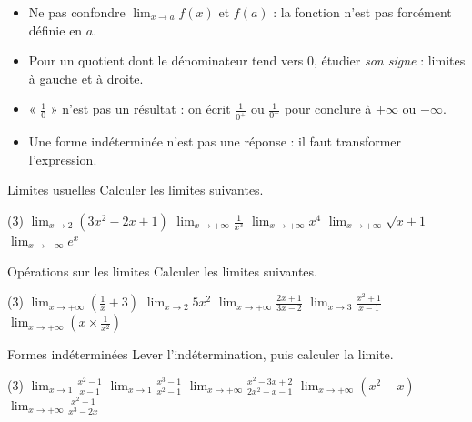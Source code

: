 \begin{attention}
\begin{itemize}[label={\color{otOrange}\textbullet},leftmargin=1.4em,itemsep=0.6mm,topsep=0.5mm]
  \item Ne pas confondre $\displaystyle\lim_{x\to a}f(x)$ et $f(a)$ : la fonction n'est pas forcément définie en $a$.
  \item Pour un quotient dont le dénominateur tend vers $0$, étudier \emph{son signe} : limites à gauche et à droite.
  \item « $\frac{1}{0}$ » n'est pas un résultat : on écrit $\frac{1}{0^{+}}$ ou $\frac{1}{0^{-}}$ pour conclure à $+\infty$ ou $-\infty$.
  \item Une forme indéterminée n'est pas une réponse : il faut transformer l'expression.
\end{itemize}
\end{attention}

\exercices
{}

\begin{exercice}[1]{Limites usuelles}
Calculer les limites suivantes.
\begin{tasks}(3)
  \task $\displaystyle\lim_{x\to2}\left(3x^{2}-2x+1\right)$
  \task $\displaystyle\lim_{x\to+\infty}\frac{1}{x^{3}}$
  \task $\displaystyle\lim_{x\to+\infty}x^{4}$
  \task $\displaystyle\lim_{x\to+\infty}\sqrt{x+1}$
  \task $\displaystyle\lim_{x\to-\infty}e^{x}$
\end{tasks}
\end{exercice}

\begin{exercice}[1]{Opérations sur les limites}
Calculer les limites suivantes.
\begin{tasks}(3)
  \task $\displaystyle\lim_{x\to+\infty}\left(\frac{1}{x}+3\right)$
  \task $\displaystyle\lim_{x\to2}5x^{2}$
  \task $\displaystyle\lim_{x\to+\infty}\frac{2x+1}{3x-2}$
  \task $\displaystyle\lim_{x\to3}\frac{x^{2}+1}{x-1}$
  \task $\displaystyle\lim_{x\to+\infty}\left(x\times\frac{1}{x^{2}}\right)$
\end{tasks}
\end{exercice}


\begin{exercice}[2]{Formes indéterminées}
Lever l'indétermination, puis calculer la limite.
\begin{tasks}(3)
  \task $\displaystyle\lim_{x\to1}\frac{x^{2}-1}{x-1}$
  \task $\displaystyle\lim_{x\to1}\frac{x^{3}-1}{x^{2}-1}$
  \task $\displaystyle\lim_{x\to+\infty}\frac{x^{2}-3x+2}{2x^{2}+x-1}$
  \task $\displaystyle\lim_{x\to+\infty}\left(x^{2}-x\right)$
  \task $\displaystyle\lim_{x\to+\infty}\frac{x^{2}+1}{x^{3}-2x}$
\end{tasks}
\end{exercice}

